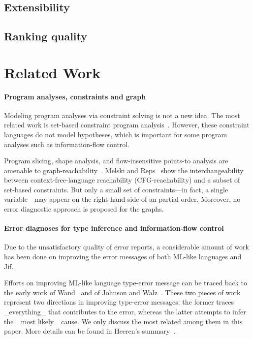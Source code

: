 \subsection{Extensibility}

\subsection{Ranking quality}

\section{Related Work}

\paragraph{Program analyses, constraints and graph} 

Modeling program analyses via constraint solving is not a new idea.
The most related work is set-based constraint program
analysis~\cite{aiken-setconstraint, aiken-typeinclusion}.  However,
these constraint languages do not model hypotheses, which is important
for some program analyses such as information-flow control.
 
Program slicing, shape analysis, and flow-insensitive points-to
analysis are amenable to graph-reachability~\cite{reps-graph}. Melski
and Reps~\cite{melski-cflgraph} show the interchangeability between
context-free-language reachability (CFG-reachability) and a subset of
set-based constraints. But only a small set of constraints---in fact,
a single variable---may appear on the right hand side of an partial
order. Moreover, no error diagnostic approach is proposed for the
graphs.

\paragraph{Error diagnoses for type inference
	    and information-flow control} 

Due to the unsatisfactory quality of error reports, a considerable
amount of work has been done on improving the error messages of both
ML-like languages and Jif.

Efforts on improving ML-like language type-error message can be
traced back to the early work of Wand~\cite{wand-errorfinding} and
of Johnson and Walz~\cite{johnson-popl86}. These two pieces of work
represent two directions in improving type-error messages: the former
traces _everything_ that contributes to the error, whereas the
latter attempts to infer the _most likely_ cause. We only discuss the
most related among them in this paper. More details can be found in
Heeren's summary~\cite{heeren:thesis}.


